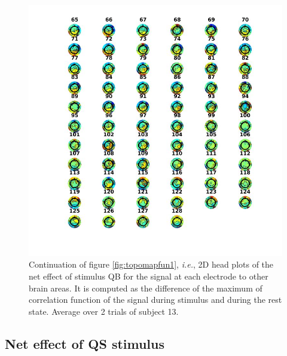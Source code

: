 \documentclass[a4paper]{article}
\begin{document}
\begin{figure}
    \centering
    \includegraphics[width=16cm]{QB2.jpg}
    \caption{Continuation of figure \ref{fig:topomapfun1}, \textit{i.e.}, 2D head plots of the net effect of stimulus QB for the signal at each electrode to other brain areas. It is computed as the difference of the maximum of correlation function of the signal during stimulus and during the rest state. Average over 2 trials of subject 13.}
    \label{fig:qb2}
\end{figure}

\subsection{Net effect of QS stimulus}
\end{document}
